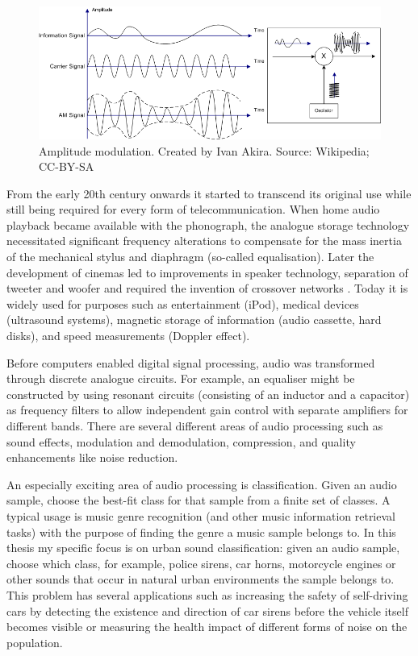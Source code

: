 \begin{figure}[h]
    \centering
	\includegraphics[width=.95\textwidth]{./images/illustrations/am}
    \caption{Amplitude modulation. Created by Ivan Akira. Source: Wikipedia; CC-BY-SA}
    \label{fig:am}
\end{figure}

From the early 20th century onwards it started to transcend its original use while still being required for every form of telecommunication. When home audio playback became available with the phonograph, the analogue storage technology necessitated significant frequency alterations to compensate for the mass inertia of the mechanical stylus and diaphragm (so-called equalisation)\cite{copeland2008manual}. Later the development of cinemas led to improvements in speaker technology, separation of tweeter and woofer and required the invention of crossover networks \cite{spanias2006audio}.
Today it is widely used for purposes such as entertainment (iPod), medical devices (ultrasound systems), magnetic storage of information (audio cassette, hard disks), and speed measurements (Doppler effect).
 
 
Before computers enabled digital signal processing, audio was transformed through discrete analogue circuits. For example, an equaliser might be constructed by using resonant circuits (consisting of an inductor and a capacitor) as frequency filters to allow independent gain control with separate amplifiers for different bands.
There are several different areas of audio processing such as sound effects, modulation and demodulation, compression, and quality enhancements like noise reduction.

An especially exciting area of audio processing is classification. Given an audio sample, choose the best-fit class for that sample from a finite set of classes. A typical usage is music genre recognition (and other music information retrieval tasks) with the purpose of finding the genre a music sample belongs to. In this thesis my specific focus is on urban sound classification: given an audio sample, choose which class, for example, police sirens, car horns, motorcycle engines or other sounds that occur in natural urban environments the sample belongs to. This problem has several applications such as increasing the safety of self-driving cars by detecting the existence and direction of car sirens before the vehicle itself becomes visible or measuring the health impact of different forms of noise on the population.

